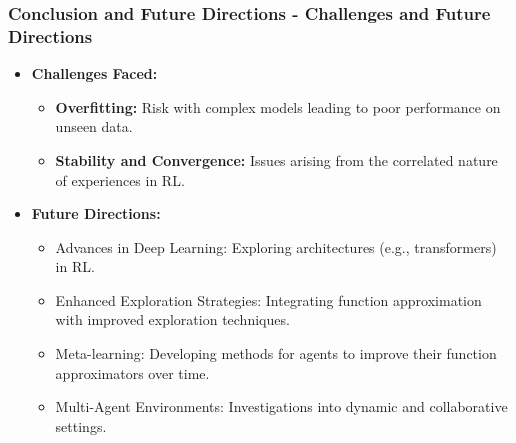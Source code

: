 \documentclass[aspectratio=169]{beamer}
\begin{document}
\begin{frame}[fragile]
    \frametitle{Conclusion and Future Directions - Challenges and Future Directions}
    \begin{itemize}
        \item \textbf{Challenges Faced:}
        \begin{itemize}
            \item \textbf{Overfitting:} Risk with complex models leading to poor performance on unseen data.
            \item \textbf{Stability and Convergence:} Issues arising from the correlated nature of experiences in RL.
        \end{itemize}
        
        \item \textbf{Future Directions:}
        \begin{itemize}
            \item Advances in Deep Learning: Exploring architectures (e.g., transformers) in RL.
            \item Enhanced Exploration Strategies: Integrating function approximation with improved exploration techniques.
            \item Meta-learning: Developing methods for agents to improve their function approximators over time.
            \item Multi-Agent Environments: Investigations into dynamic and collaborative settings.
        \end{itemize}
    \end{itemize}
\end{frame}
\end{document}
